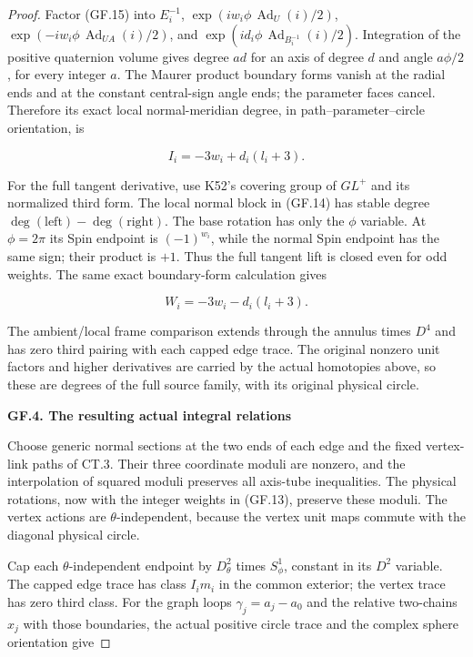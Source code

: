 \begin{proof}
Factor (GF.15) into \(E_i^{-1}\), \(\exp(iw_i\phi\,\operatorname{Ad}_U(i)/2)\),\newline
\(\exp(-iw_i\phi\,\operatorname{Ad}_{UA}(i)/2)\), and
\(\exp(id_i\phi\,\operatorname{Ad}_{B_i^{-1}}(i)/2)\). Integration of the positive
quaternion volume gives degree \(ad\) for an axis of degree \(d\) and
angle \(a\phi/2\), for every integer \(a\). The Maurer product boundary
forms vanish at the radial ends and at the constant central-sign
angle ends; the parameter faces cancel. Therefore its exact local
normal-meridian degree, in path--parameter--circle orientation, is

\[
                         I_i=-3w_i+d_i(l_i+3).         \tag{GF.16}
\]

For the full tangent derivative, use K52's covering group of
\(GL^+\) and its normalized third form. The local normal block in
(GF.14) has stable degree \(\deg(\mathrm{left})-\deg(\mathrm{right})\). The base rotation
has only the \(\phi\) variable. At \(\phi=2\pi\) its Spin endpoint is
\((-1)^{w_i}\), while the normal Spin endpoint has the same sign;
their product is \(+1\). Thus the full tangent lift is closed even
for odd weights. The same exact boundary-form calculation gives

\[
                         W_i=-3w_i-d_i(l_i+3).         \tag{GF.17}
\]

The ambient/local frame comparison extends through the annulus
times \(D^4\) and has zero third pairing with each capped edge trace.
The original nonzero unit factors and higher derivatives are
carried by the actual homotopies above, so these are degrees of
the full source family, with its original physical circle.

\par

\medskip\noindent\textbf{GF.4. The resulting actual integral relations}

\par\nobreak

Choose generic normal sections at the two ends of each edge and
the fixed vertex-link paths of CT.3. Their three coordinate
moduli are nonzero, and the interpolation of squared moduli
preserves all axis-tube inequalities. The physical rotations,
now with the integer weights in (GF.13), preserve these moduli.
The vertex actions are \(\theta\)-independent, because the vertex
unit maps commute with the diagonal physical circle.

Cap each \(\theta\)-independent endpoint by \(D^2_\theta\) times \(S^1_\phi\),
constant in its \(D^2\) variable. The capped edge trace has class
\(I_im_i\) in the common exterior; the vertex trace has zero third
class. For the graph loops \(\gamma_j=a_j-a_0\) and the relative
two-chains \(x_j\) with those boundaries, the actual positive circle
trace and the complex sphere orientation give


\end{proof}
